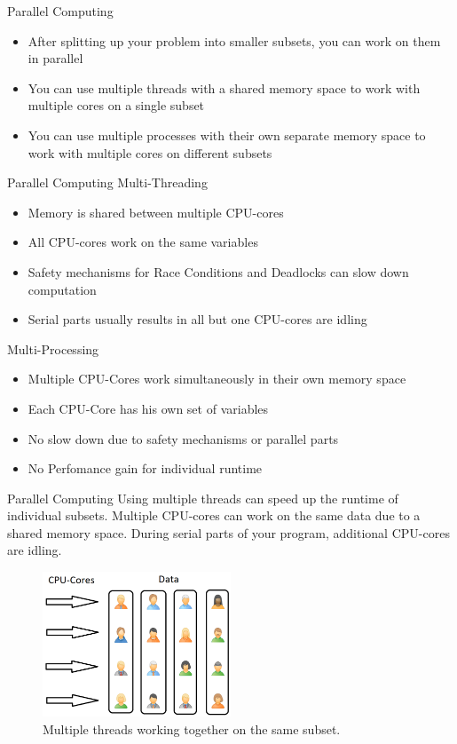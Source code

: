 \documentclass{beamer}
\begin{document}
\begin{frame}{Parallel Computing}
	\begin{itemize}
\item After splitting up your problem into smaller subsets, you can work on them in parallel
\item You can use multiple threads with a shared memory space to work with multiple cores on a single subset
\item You can use multiple processes with their own separate memory space to work with multiple cores on different subsets
	\end{itemize}


\end{frame}

\begin{frame}{Parallel Computing}
	Multi-Threading
	\begin{itemize}
		\item Memory is shared between multiple CPU-cores
		\item All CPU-cores work on the same variables
		\item Safety mechanisms for Race Conditions and Deadlocks can slow down computation
		\item Serial parts usually results in all but one CPU-cores are idling
	\end{itemize}
	Multi-Processing
	\begin{itemize}
		\item Multiple CPU-Cores work simultaneously in their own memory space
		\item Each CPU-Core has his own set of variables
		\item No slow down due to safety mechanisms or parallel parts
		\item No Perfomance gain for individual runtime
	\end{itemize}
	
	
\end{frame}

\begin{frame}{Parallel Computing}
	Using multiple threads can speed up the runtime of individual subsets. Multiple CPU-cores can work on the same data due to a shared memory space. During serial parts of your program, additional CPU-cores are idling.
	\begin{figure}
	\centering
	\includegraphics[width=0.5\textwidth]{thread.png}
	\caption{Multiple threads working together on the same subset.}
\end{figure}
\end{frame}
\end{document}
